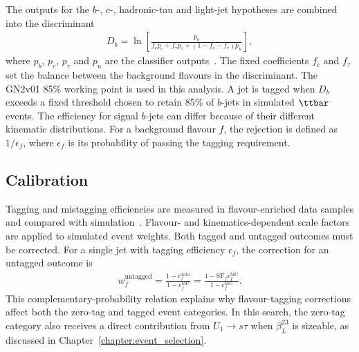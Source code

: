 The outputs for the $b$-, $c$-, hadronic-tau and light-jet hypotheses are combined into the discriminant
\begin{align}
    D_b=\ln\!\left[
    \frac{p_b}{f_c p_c+f_\tau p_\tau+(1-f_c-f_\tau)p_u}
    \right],
    \label{eq:ch6_gn2_discriminant}
\end{align}
where $p_b$, $p_c$, $p_\tau$ and $p_u$ are the classifier outputs~\cite{ATLAS2026GN2}.
The fixed coefficients $f_c$ and $f_\tau$ set the balance between the background flavours in the discriminant.
The GN2v01 85\% working point is used in this analysis.
A jet is tagged when $D_b$ exceeds a fixed threshold chosen to retain 85\% of $b$-jets in simulated $\ttbar$ events.
The efficiency for signal $b$-jets can differ because of their different kinematic distributions.
For a background flavour $f$, the rejection is defined as $1/\epsilon_f$, where $\epsilon_f$ is its probability of passing the tagging requirement.

\subsection{Calibration}

Tagging and mistagging efficiencies are measured in flavour-enriched data samples and compared with simulation~\cite{ATLAS2026GN2}.
Flavour- and kinematics-dependent scale factors are applied to simulated event weights.
Both tagged and untagged outcomes must be corrected.
For a single jet with tagging efficiency $\epsilon_f$, the correction for an untagged outcome is
\begin{align}
    w_f^{\mathrm{untagged}}
    =\frac{1-\epsilon_f^{\mathrm{data}}}{1-\epsilon_f^{\mathrm{MC}}}
    =\frac{1-\mathrm{SF}_f\epsilon_f^{\mathrm{MC}}}{1-\epsilon_f^{\mathrm{MC}}}.
    \label{eq:ch6_btag_untagged}
\end{align}
This complementary-probability relation explains why flavour-tagging corrections affect both the zero-tag and tagged event categories.
In this search, the zero-tag category also receives a direct contribution from $U_1\rightarrow s\tau$ when $\beta_L^{23}$ is sizeable, as discussed in Chapter~\ref{chapter:event_selection}.
